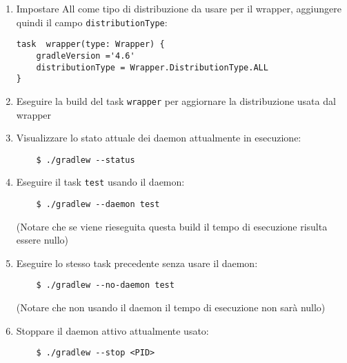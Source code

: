 \begin{enumerate}
    \item Impostare All come tipo di distribuzione da usare per il wrapper, aggiungere quindi il campo \texttt{distributionType}:
\begin{lstlisting}[frame=single]
task  wrapper(type: Wrapper) {
    gradleVersion ='4.6'
    distributionType = Wrapper.DistributionType.ALL
}
\end{lstlisting}
    \item Eseguire la build del task \texttt{wrapper} per aggiornare la distribuzione usata dal wrapper
    \item Visualizzare lo stato attuale dei daemon attualmente in esecuzione:
\begin{verbatim}
    $ ./gradlew --status\end{verbatim}
    \item Eseguire il task \texttt{test} usando il daemon:
\begin{verbatim}
    $ ./gradlew --daemon test\end{verbatim}
    (Notare che se viene rieseguita questa build il tempo di esecuzione risulta essere nullo)
    \item Eseguire lo stesso task precedente senza usare il daemon:
\begin{verbatim}
    $ ./gradlew --no-daemon test\end{verbatim}
    (Notare che non usando il daemon il tempo di esecuzione non sarà nullo)
    \item Stoppare il daemon attivo attualmente usato:
\begin{verbatim}
    $ ./gradlew --stop <PID>\end{verbatim}
\end{enumerate}